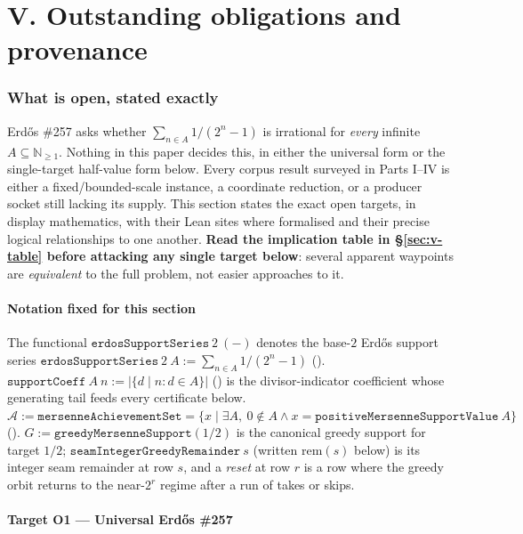 \clearpage
\part*{V. Outstanding obligations and provenance}
\section{What is open, stated exactly}

Erd\H{o}s \#257 asks whether $\sum_{n\in A}1/(2^n-1)$ is irrational for \emph{every} infinite
$A\subseteq\mathbb{N}_{\ge 1}$. Nothing in this paper decides this, in either the universal form
or the single-target half-value form below. Every corpus result surveyed in Parts I--IV is either
a fixed/bounded-scale instance, a coordinate reduction, or a producer socket still lacking its
supply. This section states the exact open targets, in display mathematics, with their Lean sites
where formalised and their precise logical relationships to one another. \textbf{Read the
implication table in \S\ref{sec:v-table} before attacking any single target below}: several
apparent waypoints are \emph{equivalent} to the full problem, not easier approaches to it.

\subsection{Notation fixed for this section}

The functional $\mathtt{erdosSupportSeries}\ 2\ (-)$ denotes the base-$2$ Erd\H{o}s support series
$\mathtt{erdosSupportSeries}\ 2\ A := \sum_{n\in A} 1/(2^n-1)$
(). $\mathtt{supportCoeff}\ A\ n :=
|\{d\mid n : d\in A\}|$ () is the divisor-indicator
coefficient whose generating tail feeds every certificate below. $\mathcal{A} :=
\mathtt{mersenneAchievementSet} = \{x\mid \exists A,\ 0\notin A\wedge x =
\mathtt{positiveMersenneSupportValue}\ A\}$ ().
$G := \mathtt{greedyMersenneSupport}(1/2)$ is the canonical greedy support for target $1/2$;
$\mathtt{seamIntegerGreedyRemainder}\ s$ (written $\mathrm{rem}(s)$ below) is its integer seam
remainder at row $s$, and a \emph{reset} at row $r$ is a row where the greedy orbit returns to the
near-$2^r$ regime after a run of takes or skips.

\subsection{Target O1 --- Universal Erd\H{o}s \#257}

